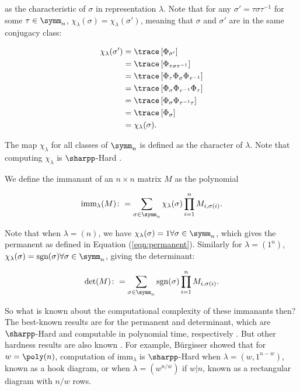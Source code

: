 \noindent as the characteristic of $\sigma$ in representation $\lambda$. Note that for any $\sigma' = \tau\sigma\tau^{-1}$ for some $\tau \in \symm_n$, $\chi_\lambda(\sigma) = \chi_\lambda(\sigma')$, meaning that $\sigma$ and $\sigma'$ are in the same conjugacy class:

\begin{align}
\chi_\lambda(\sigma') &= \trace\left[\Phi_{\sigma'}\right]\\
&= \trace\left[\Phi_{\tau\sigma\tau^{-1}}\right]\\
&= \trace\left[\Phi_{\tau}\Phi_{\sigma}\Phi_{\tau^{-1}}\right]\\
&= \trace\left[\Phi_{\sigma}\Phi_{\tau^{-1}}\Phi_{\tau}\right]\\
&= \trace\left[\Phi_{\sigma}\Phi_{\tau^{-1}\tau}\right]\\
&= \trace\left[\Phi_\sigma\right]\\
&= \chi_\lambda(\sigma).
\end{align}

The map $\chi_\lambda$ for all classes of $\symm_n$ is defined as the character of $\lambda$. Note that computing $\chi_\lambda$ is $\sharpp$-Hard \cite{hepler1994}.

We define the immanant of an $n\times n$ matrix $M$ as the polynomial

\begin{equation}
\textrm{imm}_\lambda(M) \colon= \sum_{\sigma\in\symm_n}\chi_\lambda(\sigma)\prod_{i=1}^nM_{i,\sigma(i)}.
\end{equation}

Note that when $\lambda=(n)$, we have $\chi_\lambda(\sigma)=1\forall\sigma\in\symm_n$, which gives the permanent as defined in Equation (\ref{eqn:permanent}). Similarly for $\lambda=(1^n)$, $\chi_\lambda(\sigma)=\textrm{sgn}(\sigma)\forall\sigma\in\symm_n$, giving the determinant:

\begin{equation}
\textrm{det}(M) \colon= \sum_{\sigma\in\symm_n}\textrm{sgn}(\sigma)\prod_{i=1}^nM_{i,\sigma(i)}.
\end{equation}

So what is known about the computational complexity of these immanants then? The best-known results are for the permanent and determinant, which are $\sharpp$-Hard and computable in polynomial time, respectively \cite{valiant1979, aaronson2011, fisikopoulos2016}. But other hardness results are also known \cite{hartmann1985, burgisser2000, brylinski2003, mertens2013}. For example, B\"urgisser \cite{burgisser2000immanants} showed that for $w=\poly(n)$, computation of $\textrm{imm}_\lambda$ is $\sharpp$-Hard when $\lambda=(w,1^{n-w})$, known as a hook diagram, or when $\lambda=(w^{n/w})$ if $w|n$, known as a rectangular diagram with $n/w$ rows.
